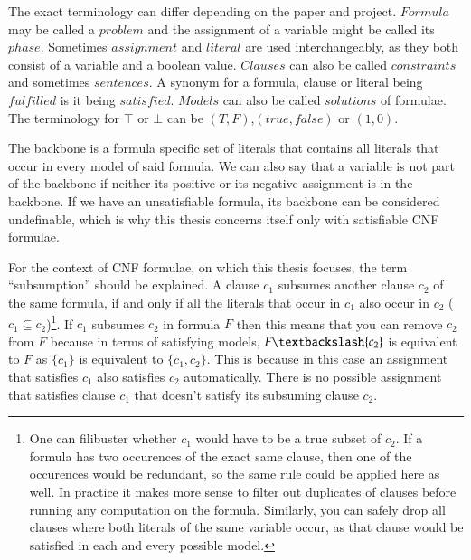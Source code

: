 

The exact terminology can differ depending on the paper and project. $Formula$ may be called a $problem$ and the assignment of a variable might be called its $phase$. Sometimes $assignment$ and $literal$ are used interchangeably, as they both consist of a variable and a boolean value. $Clauses$ can also be called $constraints$ and sometimes $sentences$. A synonym for a formula, clause or literal being $fulfilled$ is it being $satisfied$. $Models$ can also be called $solutions$ of formulae. The terminology for $\top$ or $\bot$ can be $(T,F)$,$(true,false)$ or $(1,0)$.

The backbone is a formula specific set of literals that contains all literals that occur in every model of said formula. We can also say that a variable is not part of the backbone if neither its positive or its negative assignment is in the backbone. If we have an unsatisfiable formula, its backbone can be considered undefinable, which is why this thesis concerns itself only with satisfiable CNF formulae.

For the context of CNF formulae, on which this thesis focuses, the term ``subsumption'' should be explained. A clause $c_1$ subsumes another clause $c_2$ of the same formula, if and only if all the literals that occur in $c_1$ also occur in $c_2$ ($c_1 \subseteq c_2$)\footnote{
	One can filibuster whether $c_1$ would have to be a true subset of $c_2$. If a formula has two occurences of the exact same clause, then one of the occurences would be redundant, so the same rule could be applied here as well. In practice it makes more sense to filter out duplicates of clauses before running any computation on the formula. Similarly, you can safely drop all clauses where both literals of the same variable occur, as that clause would be satisfied in each and every possible model.}.
If $c_1$ subsumes $c_2$ in formula $F$ then this means that you can remove $c_2$ from $F$ because in terms of satisfying models, $F\textbackslash \{c_2\}$ is equivalent to $F$ as $\{c_1\}$ is equivalent to $\{c_1,c_2\}$. This is because in this case an assignment that satisfies $c_1$ also satisfies $c_2$ automatically. There is no possible assignment that satisfies clause $c_1$ that doesn't satisfy its subsuming clause $c_2$.

